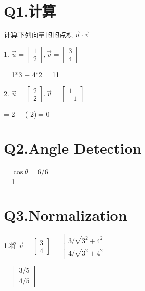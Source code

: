 \documentclass[12pt]{article}
\begin{document}
\section*{Q1.计算}
计算下列向量的的点积 $\vec{u} \cdot \vec{v}$

1. $\vec{u} = \begin{bmatrix}
    1 \\ 
    2
\end{bmatrix} ,\vec{v} = \begin{bmatrix}
    3 \\ 
    4
\end{bmatrix}  $

= 1*3  + 4*2  =  11

2. $\vec{u} = \begin{bmatrix}
    2 \\ 
    2
\end{bmatrix} ,\vec{v} = \begin{bmatrix}
    1 \\ 
    -1
\end{bmatrix}  $

=  2 + (-2) = 0


\section*{Q2.Angle Detection}
= $\cos \theta$ = 6/6 \\ 
= 1 \\ 


\section*{Q3.Normalization}
1.将 $\vec{v} = \begin{bmatrix}
    3\\
    4
\end{bmatrix}$
= $\begin{bmatrix}
    3 / \sqrt{3^{2} + 4^{2}} \\
    4 / \sqrt{3^{2} + 4^{2}}
\end{bmatrix}$

= $\begin{bmatrix}
    3 / 5 \\
    4 / 5
\end{bmatrix}$
\end{document}
